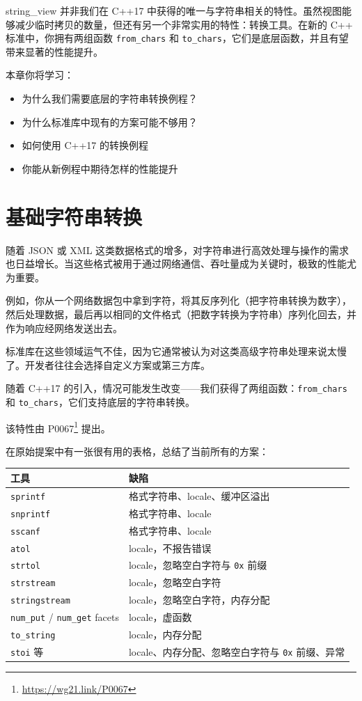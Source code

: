 string\_view 并非我们在 C++17 中获得的唯一与字符串相关的特性。虽然视图能够减少临时拷贝的数量，但还有另一个非常实用的特性：转换工具。在新的 C++ 标准中，你拥有两组函数 \texttt{from\_chars} 和 \texttt{to\_chars}，它们是底层函数，并且有望带来显著的性能提升。

本章你将学习：
\begin{itemize}
\item 为什么我们需要底层的字符串转换例程？
\item 为什么标准库中现有的方案可能不够用？
\item 如何使用 C++17 的转换例程
\item 你能从新例程中期待怎样的性能提升
\end{itemize}

\section{基础字符串转换}

随着 JSON 或 XML 这类数据格式的增多，对字符串进行高效处理与操作的需求也日益增长。当这些格式被用于通过网络通信、吞吐量成为关键时，极致的性能尤为重要。

例如，你从一个网络数据包中拿到字符，将其反序列化（把字符串转换为数字），然后处理数据，最后再以相同的文件格式（把数字转换为字符串）序列化回去，并作为响应经网络发送出去。

标准库在这些领域运气不佳，因为它通常被认为对这类高级字符串处理来说太慢了。开发者往往会选择自定义方案或第三方库。

随着 C++17 的引入，情况可能发生改变——我们获得了两组函数：\texttt{from\_chars} 和 \texttt{to\_chars}，它们支持底层的字符串转换。

该特性由 P0067\footnote{\url{https://wg21.link/P0067}} 提出。

在原始提案中有一张很有用的表格，总结了当前所有的方案：

\begin{table}[H]
\centering
\begin{tabularx}{\textwidth}{X X}
\toprule
工具 & 缺陷 \\
\midrule
\texttt{sprintf} & 格式字符串、locale、缓冲区溢出 \\
\texttt{snprintf} & 格式字符串、locale \\
\texttt{sscanf} & 格式字符串、locale \\
\texttt{atol} & locale，不报告错误 \\
\texttt{strtol} & locale，忽略空白字符与 \texttt{0x} 前缀 \\
\texttt{strstream} & locale，忽略空白字符 \\
\texttt{stringstream} & locale，忽略空白字符，内存分配 \\
\texttt{num\_put} / \texttt{num\_get} facets & locale，虚函数 \\
\texttt{to\_string} & locale，内存分配 \\
\texttt{stoi} 等 & locale、内存分配、忽略空白字符与 \texttt{0x} 前缀、异常 \\
\bottomrule
\end{tabularx}
\end{table}

